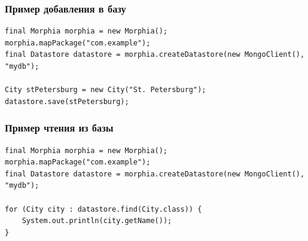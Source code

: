 \documentclass[xetex,mathserif,serif]{beamer}
\begin{document}
	\begin{frame}[fragile]
		\frametitle{Пример добавления в базу}
		\begin{footnotesize}
			\begin{verbatim}
final Morphia morphia = new Morphia();
morphia.mapPackage("com.example");
final Datastore datastore = morphia.createDatastore(new MongoClient(), "mydb");

City stPetersburg = new City("St. Petersburg");
datastore.save(stPetersburg);
			\end{verbatim}
		\end{footnotesize}
	\end{frame}

	\begin{frame}[fragile]
		\frametitle{Пример чтения из базы}
		\begin{footnotesize}
			\begin{verbatim}
final Morphia morphia = new Morphia();
morphia.mapPackage("com.example");
final Datastore datastore = morphia.createDatastore(new MongoClient(), "mydb");

for (City city : datastore.find(City.class)) {
    System.out.println(city.getName());
}
			\end{verbatim}
		\end{footnotesize}
	\end{frame}
\end{document}
